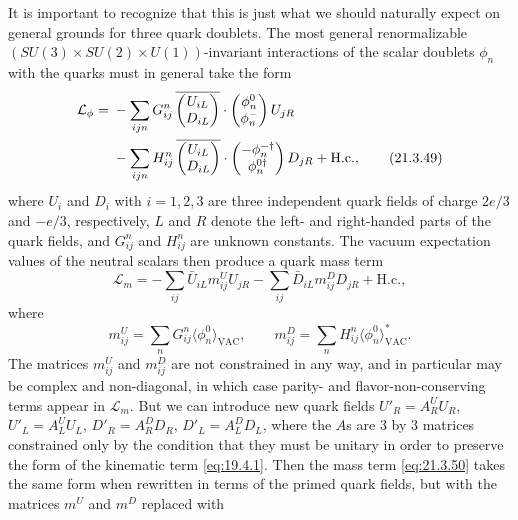 It is important to recognize that this is just what we should naturally expect on general grounds for three quark doublets. The most general renormalizable $(SU(3)\times SU(2)\times U(1))$-invariant interactions of the scalar doublets $\phi_n$ with the quarks must in general take the form
\begin{align}
\mathcal{L}_\phi
={}&-\sum_{ijn}G_{ij}^n\,
\overline{\begin{pmatrix}U_{iL}\\D_{iL}\end{pmatrix}}
\cdot
\begin{pmatrix}\phi_n^0\\\phi_n^-\end{pmatrix}
U_{jR}
\notag\\
&-\sum_{ijn}H_{ij}^n\,
\overline{\begin{pmatrix}U_{iL}\\D_{iL}\end{pmatrix}}
\cdot
\begin{pmatrix}-\phi_n^{-\dagger}\\\phi_n^{0\dagger}\end{pmatrix}
D_{jR}
+\mathrm{H.c.},
\tag{21.3.49}\label{eq:21.3.49}
\end{align}
where $U_i$ and $D_i$ with $i=1,2,3$ are three independent quark fields of charge $2e/3$ and $-e/3$, respectively, $L$ and $R$ denote the left- and right-handed parts of the quark fields, and $G_{ij}^n$ and $H_{ij}^n$ are unknown constants. The vacuum expectation values of the neutral scalars then produce a quark mass term
\begin{equation}
\mathcal{L}_m
=-\sum_{ij}\bar U_{iL}m_{ij}^U U_{jR}
-\sum_{ij}\bar D_{iL}m_{ij}^D D_{jR}
+\mathrm{H.c.},
\tag{21.3.50}\label{eq:21.3.50}
\end{equation}
where
\begin{equation}
m_{ij}^U=\sum_nG_{ij}^n\langle\phi_n^0\rangle_{\mathrm{VAC}},
\qquad
m_{ij}^D=\sum_nH_{ij}^n\langle\phi_n^0\rangle_{\mathrm{VAC}}^*.
\tag{21.3.51}\label{eq:21.3.51}
\end{equation}
The matrices $m_{ij}^U$ and $m_{ij}^D$ are not constrained in any way, and in particular may be complex and non-diagonal, in which case parity- and flavor-non-conserving terms appear in $\mathcal{L}_m$. But we can introduce new quark fields $U'_R=A_R^U U_R$, $U'_L=A_L^U U_L$, $D'_R=A_R^D D_R$, $D'_L=A_L^D D_L$, where the $A$s are $3$ by $3$ matrices constrained only by the condition that they must be unitary in order to preserve the form of the kinematic term \eqref{eq:19.4.1}. Then the mass term \eqref{eq:21.3.50} takes the same form when rewritten in terms of the primed quark fields, but with the matrices $m^U$ and $m^D$ replaced with
